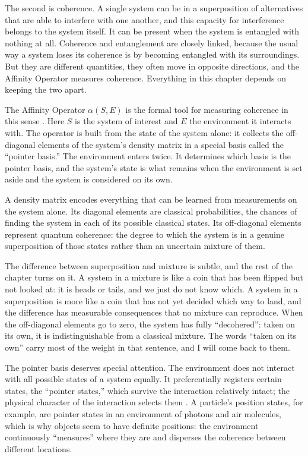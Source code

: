 The second is coherence. A single system can be in a superposition of alternatives that are able to interfere with one another, and this capacity for interference belongs to the system itself. It can be present when the system is entangled with nothing at all. Coherence and entanglement are closely linked, because the usual way a system loses its coherence is by becoming entangled with its surroundings. But they are different quantities, they often move in opposite directions, and the Affinity Operator measures coherence. Everything in this chapter depends on keeping the two apart.

The Affinity Operator $\alpha(S, E)$ is the formal tool for measuring coherence in this sense \citep{AdamsRCT}. Here $S$ is the system of interest and $E$ the environment it interacts with. The operator is built from the state of the system alone: it collects the off-diagonal elements of the system's density matrix in a special basis called the ``pointer basis.'' The environment enters twice. It determines which basis is the pointer basis, and the system's state is what remains when the environment is set aside and the system is considered on its own.

A density matrix encodes everything that can be learned from measurements on the system alone. Its diagonal elements are classical probabilities, the chances of finding the system in each of its possible classical states. Its off-diagonal elements represent quantum coherence: the degree to which the system is in a genuine superposition of those states rather than an uncertain mixture of them.

The difference between superposition and mixture is subtle, and the rest of the chapter turns on it. A system in a mixture is like a coin that has been flipped but not looked at: it is heads or tails, and we just do not know which. A system in a superposition is more like a coin that has not yet decided which way to land, and the difference has measurable consequences that no mixture can reproduce. When the off-diagonal elements go to zero, the system has fully ``decohered'': taken on its own, it is indistinguishable from a classical mixture. The words ``taken on its own'' carry most of the weight in that sentence, and I will come back to them.

The pointer basis deserves special attention. The environment does not interact with all possible states of a system equally. It preferentially registers certain states, the ``pointer states,'' which survive the interaction relatively intact; the physical character of the interaction selects them \citep{Zurek2003}. A particle's position states, for example, are pointer states in an environment of photons and air molecules, which is why objects seem to have definite positions: the environment continuously ``measures'' where they are and disperses the coherence between different locations.

